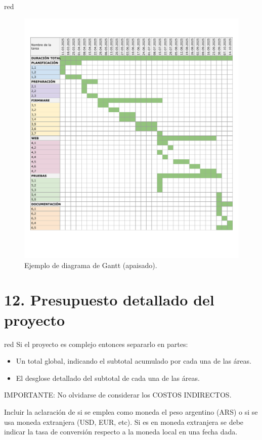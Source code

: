 \documentclass[
11pt, %
]{charter}
\begin{document}
\begin{consigna}{red}
\begin{figure}[htpb]
\centering 
\includegraphics[height=.75\textheight]{./Figuras/Gantt.pdf}
\caption{Ejemplo de diagrama de Gantt (apaisado).} %
\label{fig:diagGantt}
\end{figure}


\end{consigna}


\section{12. Presupuesto detallado del proyecto}
\label{sec:presupuesto}

\begin{consigna}{red}
Si el proyecto es complejo entonces separarlo en partes:
\begin{itemize}
	\item Un total global, indicando el subtotal acumulado por cada una de las áreas.
	\item El desglose detallado del subtotal de cada una de las áreas.
\end{itemize}

IMPORTANTE: No olvidarse de considerar los COSTOS INDIRECTOS.

Incluir la aclaración de si se emplea como moneda el peso argentino (ARS) o si se usa moneda extranjera (USD, EUR, etc). Si es en moneda extranjera se debe indicar la tasa de conversión respecto a la moneda local en una fecha dada.

\end{consigna}
\end{document}
